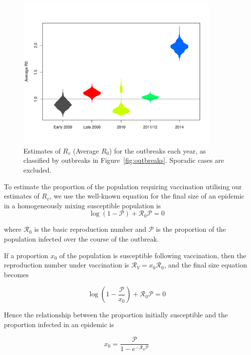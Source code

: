 \documentclass{article}
\newcommand{\Pe}{\mathcal{P}}
\newcommand{\Ro}{\mathcal{R}_0}
\newcommand{\Rr}{\mathcal{R}}
\begin{document}
\begin{itemize}
\begin{figure}
     \centering
     \includegraphics[width=0.9\textwidth]{averageR0.pdf}
     \caption{Estimates of $R_v$ (Average $R_0$) for the outbreaks each year, as classified by outbreaks in Figure~\ref{fig:outbreaks}. Sporadic cases are excluded.}
     \label{fig:r0}
\end{figure}

To estimate the proportion of the population requiring vaccination utilising our estimates of $R_v$, we use the well-known equation for the final size of an epidemic in a homogeneously mixing susceptible population is \citep{diekmann13}
\begin{equation} \label{eq:eqn1}
\log\left(1-\Pe\right)+\Ro\Pe=0
\end{equation}

where $\Ro$ is the basic reproduction number and $\Pe$ is the proportion of the population infected over the course of the outbreak.

If a proportion $x_0$ of the population is susceptible following vaccination, then the  reproduction number under vaccination is $\Rr_V=x_0\Ro$, and the final size equation becomes

\begin{equation} \label{eq:eqn2}
\log\left(1-\frac{\Pe}{x_0}\right)+\Ro\Pe=0
\end{equation}

Hence the relationship between the proportion initially susceptible and the proportion infected in an epidemic is

\begin{equation} \label{eq:eqn3}
x_0=\frac{\Pe}{1-e^{-\Ro\Pe}}
\end{equation}


\end{itemize}
\end{document}

